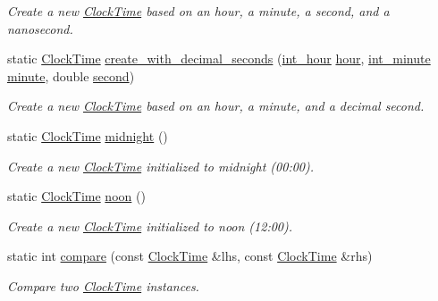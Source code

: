 \begin{DoxyCompactItemize}
\begin{DoxyCompactList}\small\item\em Create a new \hyperlink{structClockTime}{Clock\-Time} based on an hour, a minute, a second, and a nanosecond. \end{DoxyCompactList}\item 
static \hyperlink{structClockTime}{Clock\-Time} \hyperlink{structClockTime_a71e4e398da2cb0cfd3adb3f87cb6f3c2}{create\-\_\-with\-\_\-decimal\-\_\-seconds} (\hyperlink{types_8h_abc83767329d565949a30f9990b5b2323}{int\-\_\-hour} \hyperlink{structClockTime_a46aca2fc3ed57f80398729383d7b81d3}{hour}, \hyperlink{types_8h_ac1c9417e7360815b48bbc1efa2b8240c}{int\-\_\-minute} \hyperlink{structClockTime_a812681b81ece92f27756f0618e56f37b}{minute}, double \hyperlink{structClockTime_a568f139cb2e19fca3e2ae2acdf47787f}{second})
\begin{DoxyCompactList}\small\item\em Create a new \hyperlink{structClockTime}{Clock\-Time} based on an hour, a minute, and a decimal second. \end{DoxyCompactList}\item 
static \hyperlink{structClockTime}{Clock\-Time} \hyperlink{structClockTime_a7baab35d60ad3a2236c14133d8d0083b}{midnight} ()
\begin{DoxyCompactList}\small\item\em Create a new \hyperlink{structClockTime}{Clock\-Time} initialized to midnight (00\-:00). \end{DoxyCompactList}\item 
static \hyperlink{structClockTime}{Clock\-Time} \hyperlink{structClockTime_ae206b86808ff1d0158cbc920eb289797}{noon} ()
\begin{DoxyCompactList}\small\item\em Create a new \hyperlink{structClockTime}{Clock\-Time} initialized to noon (12\-:00). \end{DoxyCompactList}\item 
static int \hyperlink{structClockTime_a4c185648dcfc28f46ac3fc700b3415c2}{compare} (const \hyperlink{structClockTime}{Clock\-Time} \&lhs, const \hyperlink{structClockTime}{Clock\-Time} \&rhs)
\begin{DoxyCompactList}\small\item\em Compare two \hyperlink{structClockTime}{Clock\-Time} instances. \end{DoxyCompactList}\end{DoxyCompactItemize}
